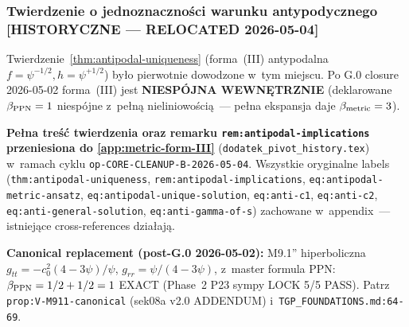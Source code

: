 \subsubsection{Twierdzenie o jednoznaczno\'sci warunku antypodycznego
[HISTORYCZNE — RELOCATED 2026-05-04]}%
\label{sssec:antipodal-uniqueness}
%
%

\begin{remark}%
\label{rem:form-III-relocated}
Twierdzenie~\ref{thm:antipodal-uniqueness} (forma~(III) antypodalna
$f=\psi^{-1/2}, h=\psi^{+1/2}$) by\l{}o pierwotnie dowodzone w~tym
miejscu. Po G.0 closure 2026-05-02 forma~(III) jest \textbf{NIESP\'OJNA
WEWN\k{E}TRZNIE} (deklarowane $\beta_{\rm PPN}=1$ niesp\'ojne z~pe\l{}n\k{a}
nieliniowo\'sci\k{a}~--- pe\l{}na ekspansja daje $\beta_{\rm metric}=3$).

\textbf{Pe\l{}na tre\'s\'c twierdzenia oraz remarku
\texttt{rem:antipodal-implications} przeniesiona do
\ref{app:metric-form-III}} (\texttt{dodatek\_pivot\_history.tex})
w~ramach cyklu \texttt{op-CORE-CLEANUP-B-2026-05-04}. Wszystkie
oryginalne labels (\texttt{thm:antipodal-uniqueness},
\texttt{rem:antipodal-implications},
\texttt{eq:antipodal-metric-ansatz},
\texttt{eq:antipodal-unique-solution}, \texttt{eq:anti-c1},
\texttt{eq:anti-c2}, \texttt{eq:anti-general-solution},
\texttt{eq:anti-gamma-of-s}) zachowane w~appendix~--- istniej\k{a}ce
cross-references dzia\l{}aj\k{a}.

\textbf{Canonical replacement (post-G.0 2026-05-02):} M9.1'' hiperboliczna
$g_{tt}=-c_0^2(4-3\psi)/\psi$, $g_{rr}=\psi/(4-3\psi)$, z~master formula
PPN: $\beta_{\rm PPN} = 1/2 + 1/2 = 1$ EXACT (Phase~2 P23 sympy LOCK
5/5 PASS). Patrz \texttt{prop:V-M911-canonical} (sek08a v2.0 ADDENDUM)
i~\texttt{TGP\_FOUNDATIONS.md:64-69}.
\end{remark}




